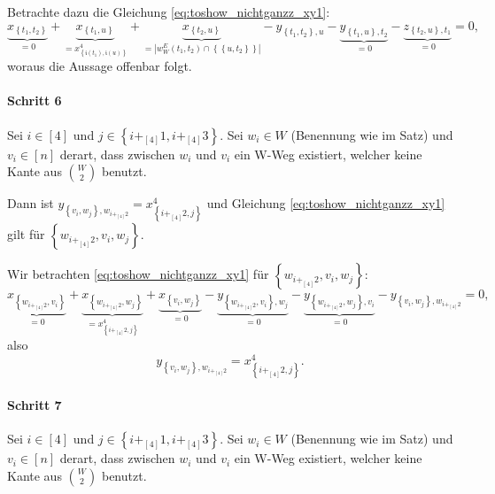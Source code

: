 \documentclass[10p,a4paper,BCOR = 12mm, DIV=15]{scrbook}
\begin{document}
\begin{bew}
Betrachte dazu die Gleichung \eqref{eq:toshow_nichtganzz_xy1}:
\begin{displaymath}
\underbrace{x_{\left\{t_1, t_2\right\}}}_{= 0} + \underbrace{x_{\left\{t_1, u\right\}}}_{= x^4_{\left\{\mathfrak{i}\left(t_1\right), \mathfrak{i}\left(u\right)\right\}}} + \underbrace{x_{\left\{t_2, u\right\}}}_{= \left|w_W^E\left(t_1, t_2\right) \cap \left\{\left\{u, t_2\right\}\right\}\right|} - y_{\left\{t_1, t_2\right\}, u} - \underbrace{y_{\left\{t_1, u\right\}, t_2}}_{= 0} - \underbrace{z_{\left\{t_2, u\right\}, t_1}}_{= 0} = 0,
\end{displaymath} 
woraus die Aussage offenbar folgt.

\paragraph{Schritt 6} Sei $i \in \left[4\right]$ und $j \in \left\{i +_{\left[4\right]} 1, i +_{\left[4\right]} 3\right\}$. Sei $w_i \in W$ (Benennung wie im Satz) und $v_i \in \left[n\right]$ derart, dass zwischen $w_i$ und $v_i$ ein W-Weg existiert, welcher keine Kante aus ${W \choose 2}$ benutzt.

Dann ist $y_{\left\{v_i, w_j\right\}, w_{i+_{\left[4\right]} 2}} = x^{4}_{\left\{i+_{\left[4\right]} 2, j\right\}}$ und Gleichung \eqref{eq:toshow_nichtganzz_xy1} gilt für $\left\{w_{i+_{\left[4\right]} 2}, v_i, w_j\right\}$.

Wir betrachten \eqref{eq:toshow_nichtganzz_xy1} für $\left\{w_{i+_{\left[4\right]} 2}, v_i, w_j\right\}$:
\begin{displaymath}
\underbrace{x_{\left\{w_{i+_{\left[4\right]} 2}, v_i\right\}}}_{= 0} + \underbrace{x_{\left\{w_{i+_{\left[4\right]} 2}, w_j\right\}}}_{= x^{4}_{\left\{i+_{\left[4\right]} 2, j\right\}}} + \underbrace{x_{\left\{v_i, w_j\right\}}}_{= 0}
- \underbrace{y_{\left\{w_{i+_{\left[4\right]} 2}, v_i\right\}, w_j}}_{= 0} - \underbrace{y_{\left\{w_{i+_{\left[4\right]} 2}, w_j\right\}, v_i}}_{= 0} - y_{\left\{v_i, w_j\right\}, w_{i+_{\left[4\right]} 2}} = 0,
\end{displaymath}
also
\begin{equation}
y_{\left\{v_i, w_j\right\}, w_{i+_{\left[4\right]} 2}} = x^{4}_{\left\{i+_{\left[4\right]} 2, j\right\}}. \label{eq:y_v_i, w_j__w_iplus2}
\end{equation}


\paragraph{Schritt 7} Sei $i \in \left[4\right]$ und $j \in \left\{i +_{\left[4\right]} 1, i +_{\left[4\right]} 3\right\}$. Sei $w_i \in W$ (Benennung wie im Satz) und $v_i \in \left[n\right]$ derart, dass zwischen $w_i$ und $v_i$ ein W-Weg existiert, welcher keine Kante aus ${W \choose 2}$ benutzt.


\end{bew}
\end{document}
